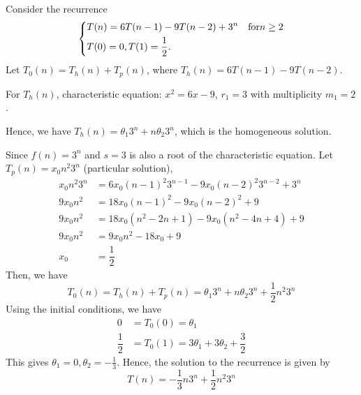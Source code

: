 \begin{eg}
    Consider the recurrence
    \[
        \begin{dcases}
            T(n) = 6T(n - 1) - 9T(n - 2) + 3^n\quad\text{for} n \geq 2\\
            T(0) = 0, T(1) = \frac{1}{2}.
        \end{dcases}
    \]
    Let \(T_0(n) = T_h(n) + T_p(n)\), where \(T_h(n) = 6T(n - 1) - 9T(n - 2)\). 
    
    For \(T_h(n)\), characteristic equation: \(x^2 = 6x - 9\), \(r_1 = 3\) with multiplicity \(m_1 = 2\). 
    
    Hence, we have \(T_h(n) = \theta_1 3^n + n\theta_2 3^n\), which is the homogeneous solution. 

    Since \(f(n) = 3^n\) and \(s = 3\) is also a root of the characteristic equation. Let \(T_p(n) = x_0 n^2 3^n\) (particular solution),
    \[
        \begin{aligned}
            x_0 n^2 3^n &= 6x_0 (n-1)^2 3^{n-1} - 9x_0 (n-2)^2 3^{n-2} + 3^n \\
            9x_0 n^2 &= 18x_0 (n-1)^2 - 9x_0 (n-2)^2 + 9\\
            9x_0 n^2 &= 18x_0 (n^2 - 2n + 1) - 9x_0 (n^2 - 4n + 4) + 9\\
            9x_0 n^2 &= 9x_0 n^2 - 18 x_0 + 9 \\
            x_0 &= \dfrac{1}{2}
        \end{aligned}
    \]
    Then, we have
    \[
        T_0(n) = T_h(n) + T_p(n) = \theta_1 3^n + n\theta_2 3^n + \dfrac{1}{2}n^2 3^n
    \]
    Using the initial conditions, we have
    \[
        \begin{aligned}
            0 &= T_0(0) = \theta_1 \\
            \dfrac{1}{2} &= T_0(1) = 3\theta_1 + 3\theta_2 + \dfrac{3}{2}
        \end{aligned}
    \]
    This gives \(\theta_1 = 0, \theta_2 = -\frac{1}{3}\). Hence, the solution to the recurrence is given by
    \[
        T(n) = -\dfrac{1}{3}n3^n + \dfrac{1}{2}n^2 3^n
    \]
\end{eg}

